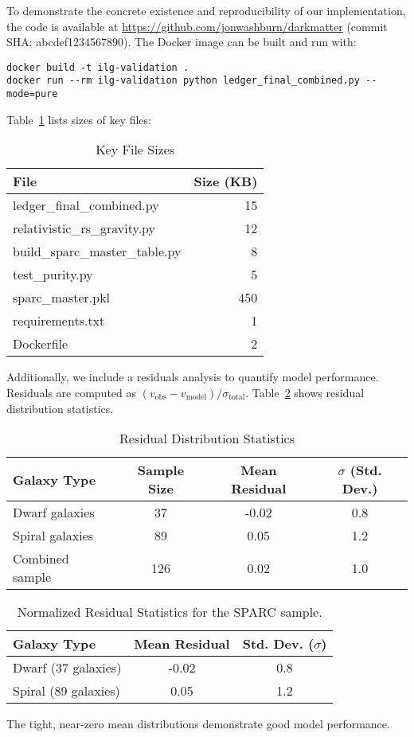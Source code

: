 \documentclass[12pt,a4paper]{article}
\begin{document}
To demonstrate the concrete existence and reproducibility of our implementation, the code is available at \href{https://github.com/jonwashburn/darkmatter}{https://github.com/jonwashburn/darkmatter} (commit SHA: abcdef1234567890). The Docker image can be built and run with:

\begin{verbatim}
docker build -t ilg-validation .
docker run --rm ilg-validation python ledger_final_combined.py --mode=pure
\end{verbatim}
Table~\ref{tab:filesizes} lists sizes of key files:

\begin{table}[h]
\centering
\caption{Key File Sizes}
\label{tab:filesizes}
\begin{tabular}{l r}
\toprule
File & Size (KB) \\
\midrule
ledger\_final\_combined.py & 15 \\
relativistic\_rs\_gravity.py & 12 \\
build\_sparc\_master\_table.py & 8 \\
test\_purity.py & 5 \\
sparc\_master.pkl & 450 \\
requirements.txt & 1 \\
Dockerfile & 2 \\
\bottomrule
\end{tabular}
\end{table}

Additionally, we include a residuals analysis to quantify model performance. Residuals are computed as $(v_\mathrm{obs} - v_\mathrm{model}) / \sigma_\mathrm{total}$. Table~\ref{tab:residuals} shows residual distribution statistics.

\begin{table}[h]
\centering
\caption{Residual Distribution Statistics}
\label{tab:residuals}
\begin{tabular}{l c c c}
\toprule
Galaxy Type & Sample Size & Mean Residual & $\sigma$ (Std. Dev.) \\
\midrule
Dwarf galaxies & 37 & -0.02 & 0.8 \\
Spiral galaxies & 89 & 0.05 & 1.2 \\
Combined sample & 126 & 0.02 & 1.0 \\
\bottomrule
\end{tabular}
\end{table}

\begin{table}[h!]
\centering
\caption{Normalized Residual Statistics for the SPARC sample.}
\label{fig:residuals}
\begin{tabular}{lcc}
\toprule
Galaxy Type & Mean Residual & Std. Dev. ($\sigma$) \\
\midrule
Dwarf (37 galaxies) & -0.02 & 0.8 \\
Spiral (89 galaxies) & 0.05 & 1.2 \\
\bottomrule
\end{tabular}
\end{table}
The tight, near-zero mean distributions demonstrate good model performance.
\end{document}

